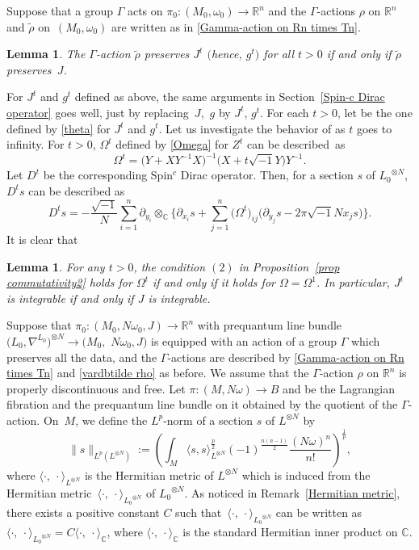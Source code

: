 \documentclass[10pt,a4paper]{amsart}
\numberwithin{equation}{section}
\newtheorem{Lemma}[Theorem]{Lemma}
\newcommand{\C}{\mathbb{C}}
\newcommand{\R}{\mathbb{R}}
\renewcommand{\tilde}{\widetilde}
\newcommand{\norm}[1]{\lVert#1\rVert}
\begin{document}
Suppose that a group $\Gamma$ acts on $\pi_0\colon (M_0,\omega_0)\to \R^n$ and the $\Gamma$-actions $\rho$ on $\R^n$ and $\tilde \rho$ on~${(M_0,\omega_0)}$ are written as in \eqref{Gamma-action on Rn times Tn}. %
\begin{Lemma}
The $\Gamma$-action $\tilde \rho$ preserves $J^t$ $($hence, $g^t)$ for all $t>0$ if and only if $\tilde \rho$ preserves~$J$.
\end{Lemma}


For $J^t$ and $g^t$ defined as above, the same arguments in Section~\ref{Spin-c Dirac operator} goes well, just by replacing~$J$,~$g$ by $J^t$, $g^t$. For each $t>0$, let  be the one defined by \eqref{theta} for $J^t$ and $g^t$. Let us investigate the behavior of  as $t$ goes to infinity.
%
For $t>0$, $\Omega^t$ defined by \eqref{Omega} for $Z^t$ can be described~as
\begin{equation}\label{Omega-t}
\Omega^t=\bigl(Y+XY^{-1}X\bigr)^{-1}\bigl(X+t\sqrt{-1}Y\bigr)Y^{-1}.
\end{equation}
Let $D^t$ be the corresponding Spin${}^c$ Dirac operator. Then, for a section $s$ of ${L_0}^{\otimes N}$, $D^ts$ can be described as
\[%
D^ts=-\frac{\sqrt{-1}}{N}\sum_{i=1}^n\partial_{y_i}\otimes_{\C}\biggl\{\partial_{x_i}s+\sum_{j=1}^n\bigl(\Omega^t\bigr)_{ij}\bigl(\partial_{y_j}s -2\pi\sqrt{-1}Nx_js\bigr)\biggr\}.
\]
It is clear that
\begin{Lemma}
For any $t>0$, the condition $(2)$ in Proposition~{\rm\ref{prop commutativity2}} holds for $\Omega^t$ if and only if it holds for $\Omega=\Omega^1$. In particular, $J^t$ is integrable if and only if $J$ is integrable.
\end{Lemma}
Suppose that $\pi_0\colon (M_0,N\omega_0,J)\to \R^n$ with prequantum line bundle $\bigl({L_0}, \nabla^{L_0}\bigr)^{\otimes N}\to (M_0,$ $N\omega_0, J)$ is equipped with an action of a group $\Gamma$ which preserves all the data, and the $\Gamma$-actions are described by \eqref{Gamma-action on Rn times Tn} and \eqref{vardbtilde rho} as before. We assume that the $\Gamma$-action $\rho$ on $\R^n$ is properly discontinuous and free. Let $\pi \colon (M,N\omega)\to B$ and  be the Lagrangian fibration and the prequantum line bundle on it obtained by the quotient of the $\Gamma$-action.
On~$M$, we define the $L^p$-norm of a section $s$ of $L^{\otimes N}$ by
\[%
\norm{s}_{L^p(L^{\otimes N})}:=\left(\int_M\langle s, s\rangle_{L^{\otimes N}}^{\frac{p}{2}} (-1)^{\frac{n(n-1)}{2}}\dfrac{(N\omega)^n}{n!}\right)^\frac{1}{p},
\]
where $\langle \cdot ,\ \cdot \rangle_{L^{\otimes N}}$ is the Hermitian metric of $L^{\otimes N}$ which is induced from the Hermitian metric~${\langle \cdot ,\ \cdot \rangle_{{L_0}^{\otimes N}}}$ of ${L_0}^{\otimes N}$. As noticed in Remark~\ref{Hermitian metric},
there exists a positive constant $C$ such that~${\langle \cdot ,\ \cdot \rangle_{{L_0}^{\otimes N}}}$ can be written as $\langle \cdot ,\ \cdot \rangle_{{L_0}^{\otimes N}} =C \langle \cdot ,\ \cdot \rangle_{\C}$, where $\langle \cdot ,\ \cdot \rangle_{\C}$ is the standard Hermitian inner product on $\C$.
\end{document}
